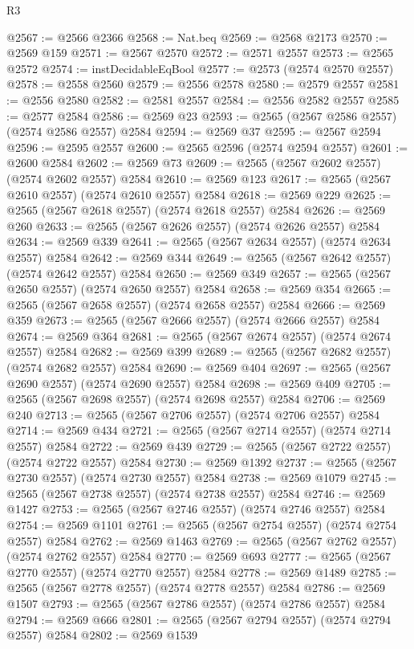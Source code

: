 \begin{lexlean}{R3}
\begin{coremodule}
@2567 := @2566 @2366
@2568 := Nat.beq
@2569 := @2568 @2173
@2570 := @2569 @159
@2571 := @2567 @2570
@2572 := @2571 @2557
@2573 := @2565 @2572
@2574 := instDecidableEqBool
@2577 := @2573 (@2574 @2570 @2557)
@2578 := @2558 @2560
@2579 := @2556 @2578
@2580 := @2579 @2557
@2581 := @2556 @2580
@2582 := @2581 @2557
@2584 := @2556 @2582 @2557
@2585 := @2577 @2584
@2586 := @2569 @23
@2593 := @2565 (@2567 @2586 @2557) (@2574 @2586 @2557) @2584
@2594 := @2569 @37
@2595 := @2567 @2594
@2596 := @2595 @2557
@2600 := @2565 @2596 (@2574 @2594 @2557)
@2601 := @2600 @2584
@2602 := @2569 @73
@2609 := @2565 (@2567 @2602 @2557) (@2574 @2602 @2557) @2584
@2610 := @2569 @123
@2617 := @2565 (@2567 @2610 @2557) (@2574 @2610 @2557) @2584
@2618 := @2569 @229
@2625 := @2565 (@2567 @2618 @2557) (@2574 @2618 @2557) @2584
@2626 := @2569 @260
@2633 := @2565 (@2567 @2626 @2557) (@2574 @2626 @2557) @2584
@2634 := @2569 @339
@2641 := @2565 (@2567 @2634 @2557) (@2574 @2634 @2557) @2584
@2642 := @2569 @344
@2649 := @2565 (@2567 @2642 @2557) (@2574 @2642 @2557) @2584
@2650 := @2569 @349
@2657 := @2565 (@2567 @2650 @2557) (@2574 @2650 @2557) @2584
@2658 := @2569 @354
@2665 := @2565 (@2567 @2658 @2557) (@2574 @2658 @2557) @2584
@2666 := @2569 @359
@2673 := @2565 (@2567 @2666 @2557) (@2574 @2666 @2557) @2584
@2674 := @2569 @364
@2681 := @2565 (@2567 @2674 @2557) (@2574 @2674 @2557) @2584
@2682 := @2569 @399
@2689 := @2565 (@2567 @2682 @2557) (@2574 @2682 @2557) @2584
@2690 := @2569 @404
@2697 := @2565 (@2567 @2690 @2557) (@2574 @2690 @2557) @2584
@2698 := @2569 @409
@2705 := @2565 (@2567 @2698 @2557) (@2574 @2698 @2557) @2584
@2706 := @2569 @240
@2713 := @2565 (@2567 @2706 @2557) (@2574 @2706 @2557) @2584
@2714 := @2569 @434
@2721 := @2565 (@2567 @2714 @2557) (@2574 @2714 @2557) @2584
@2722 := @2569 @439
@2729 := @2565 (@2567 @2722 @2557) (@2574 @2722 @2557) @2584
@2730 := @2569 @1392
@2737 := @2565 (@2567 @2730 @2557) (@2574 @2730 @2557) @2584
@2738 := @2569 @1079
@2745 := @2565 (@2567 @2738 @2557) (@2574 @2738 @2557) @2584
@2746 := @2569 @1427
@2753 := @2565 (@2567 @2746 @2557) (@2574 @2746 @2557) @2584
@2754 := @2569 @1101
@2761 := @2565 (@2567 @2754 @2557) (@2574 @2754 @2557) @2584
@2762 := @2569 @1463
@2769 := @2565 (@2567 @2762 @2557) (@2574 @2762 @2557) @2584
@2770 := @2569 @693
@2777 := @2565 (@2567 @2770 @2557) (@2574 @2770 @2557) @2584
@2778 := @2569 @1489
@2785 := @2565 (@2567 @2778 @2557) (@2574 @2778 @2557) @2584
@2786 := @2569 @1507
@2793 := @2565 (@2567 @2786 @2557) (@2574 @2786 @2557) @2584
@2794 := @2569 @666
@2801 := @2565 (@2567 @2794 @2557) (@2574 @2794 @2557) @2584
@2802 := @2569 @1539

\end{coremodule}
\end{lexlean}
